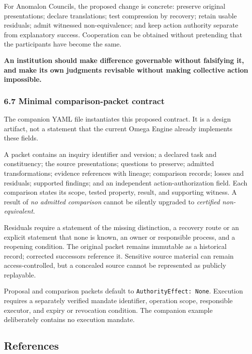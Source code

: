 \documentclass[
  10pt,
]{article}
\begin{document}
For Anomalon Councils, the proposed change is concrete: preserve original presentations; declare translations; test compression by recovery; retain usable residuals; admit witnessed non-equivalence; and keep action authority separate from explanatory success. Cooperation can be obtained without pretending that the participants have become the same.

\textbf{An institution should make difference governable without falsifying it, and make its own judgments revisable without making collective action impossible.}

\subsubsection{6.7 Minimal comparison-packet contract}\label{minimal-comparison-packet-contract}

The companion YAML file instantiates this proposed contract. It is a design artifact, not a statement that the current Omega Engine already implements these fields.

A packet contains an inquiry identifier and version; a declared task and constituency; the source presentations; questions to preserve; admitted transformations; evidence references with lineage; comparison records; losses and residuals; supported findings; and an independent action-authorization field. Each comparison states its scope, tested property, result, and supporting witness. A result of \emph{no admitted comparison} cannot be silently upgraded to \emph{certified non-equivalent}.

Residuals require a statement of the missing distinction, a recovery route or an explicit statement that none is known, an owner or responsible process, and a reopening condition. The original packet remains immutable as a historical record; corrected successors reference it. Sensitive source material can remain access-controlled, but a concealed source cannot be represented as publicly replayable.

Proposal and comparison packets default to \texttt{AuthorityEffect:\ None}. Execution requires a separately verified mandate identifier, operation scope, responsible executor, and expiry or revocation condition. The companion example deliberately contains no execution mandate.

\subsection{References}\label{references}
\end{document}
